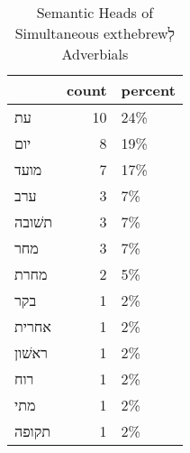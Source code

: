 \begin{table}[htbp!]
\centering
\caption{Semantic Heads of Simultaneous 	exthebrew{לְ} Adverbials}
\label{table:siml_head_cp}
\begin{tabular}{lrl}
\toprule
{} &  count & percent \\
\midrule
עת     &     10 &     24\% \\
יום    &      8 &     19\% \\
מועד   &      7 &     17\% \\
ערב    &      3 &      7\% \\
תשׁובה &      3 &      7\% \\
מחר    &      3 &      7\% \\
מחרת   &      2 &      5\% \\
בקר    &      1 &      2\% \\
אחרית  &      1 &      2\% \\
ראשׁון &      1 &      2\% \\
רוח    &      1 &      2\% \\
מתי    &      1 &      2\% \\
תקופה  &      1 &      2\% \\
\bottomrule
\end{tabular}
\end{table}
